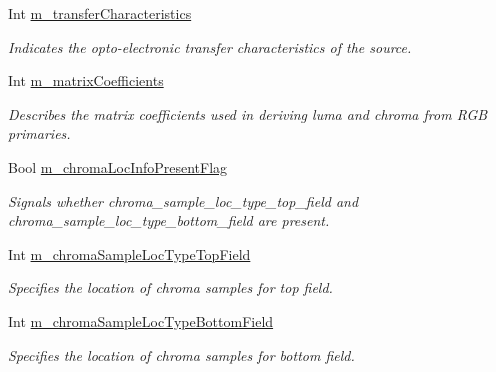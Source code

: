 \begin{DoxyCompactItemize}
\mbox{\label{class_t_app_enc_cfg_a45beb4de1ad88817c97c86b6368dece2}} 
Int \hyperlink{class_t_app_enc_cfg_a45beb4de1ad88817c97c86b6368dece2}{m\+\_\+transfer\+Characteristics}
\begin{DoxyCompactList}\small\item\em Indicates the opto-\/electronic transfer characteristics of the source. \end{DoxyCompactList}\item 
\mbox{\label{class_t_app_enc_cfg_a418bd739077f745089ff20900d526c71}} 
Int \hyperlink{class_t_app_enc_cfg_a418bd739077f745089ff20900d526c71}{m\+\_\+matrix\+Coefficients}
\begin{DoxyCompactList}\small\item\em Describes the matrix coefficients used in deriving luma and chroma from R\+GB primaries. \end{DoxyCompactList}\item 
\mbox{\label{class_t_app_enc_cfg_a509636a6bf9b43d1519f8591a9116446}} 
Bool \hyperlink{class_t_app_enc_cfg_a509636a6bf9b43d1519f8591a9116446}{m\+\_\+chroma\+Loc\+Info\+Present\+Flag}
\begin{DoxyCompactList}\small\item\em Signals whether chroma\+\_\+sample\+\_\+loc\+\_\+type\+\_\+top\+\_\+field and chroma\+\_\+sample\+\_\+loc\+\_\+type\+\_\+bottom\+\_\+field are present. \end{DoxyCompactList}\item 
\mbox{\label{class_t_app_enc_cfg_a794a7462d79bc2c4ab728bf63826bb1d}} 
Int \hyperlink{class_t_app_enc_cfg_a794a7462d79bc2c4ab728bf63826bb1d}{m\+\_\+chroma\+Sample\+Loc\+Type\+Top\+Field}
\begin{DoxyCompactList}\small\item\em Specifies the location of chroma samples for top field. \end{DoxyCompactList}\item 
\mbox{\label{class_t_app_enc_cfg_a9deac8ea16004a0d33f00a0a74142466}} 
Int \hyperlink{class_t_app_enc_cfg_a9deac8ea16004a0d33f00a0a74142466}{m\+\_\+chroma\+Sample\+Loc\+Type\+Bottom\+Field}
\begin{DoxyCompactList}\small\item\em Specifies the location of chroma samples for bottom field. \end{DoxyCompactList}\item 

\end{DoxyCompactItemize}
